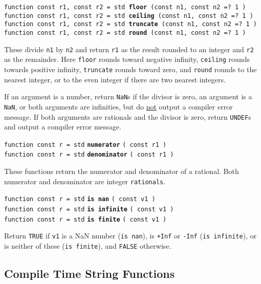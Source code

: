 \documentclass[12pt]{article}
\newcommand{\ttkey}[1]{{\tt \bfseries #1}}
\newenvironment{indpar}[1][0.3in]%
	{\begin{list}{}%
		     {\setlength{\itemsep}{0in}%
		      \setlength{\topsep}{0in}%
		      \setlength{\parsep}{1ex}%
		      \setlength{\labelwidth}{#1}%
		      \setlength{\leftmargin}{#1}%
		      \addtolength{\leftmargin}{\labelsep}}%
	 \item}%
	{\end{list}}
\begin{document}
{\tt function const r1, const r2 =
    std \ttkey{floor} (const n1, const n2 =? 1 )} \\
{\tt function const r1, const r2 =
    std \ttkey{ceiling} (const n1, const n2 =? 1 )} \\
{\tt function const r1, const r2 =
    std \ttkey{truncate} (const n1, const n2 =? 1 )} \\
{\tt function const r1, const r2 =
    std \ttkey{round} (const n1, const n2 =? 1 )}
\begin{indpar}
These divide {\tt n1} by {\tt n2} and return {\tt r1} as the
result rounded to an integer and {\tt r2} as the remainder.
Here {\tt floor} rounds toward negative infinity, {\tt ceiling}
rounds towards positive infinity, {\tt truncate} rounds toward
zero, and {\tt round} rounds to the nearest integer, or to the
even integer if there are two nearest integers.

If an argument is a number, return {\tt NaN}s if the divisor is
zero, an argument is a {\tt NaN}, or both arguments are infinities, but
do \underline{not} output a compiler error message.  If both
arguments are rationals and the divisor is zero, return
{\tt UNDEF}s and output a compiler error message.
\end{indpar}

{\tt function const r = std} \ttkey{numerator} {\tt ( const r1 )} \\
{\tt function const r = std} \ttkey{denominator} {\tt ( const r1 )}
\begin{indpar}
These functions return the numerator and denominator of a rational.
Both numerator and denominator are integer {\tt rationals}.
\end{indpar}

{\tt function const r = std} \ttkey{is nan} {\tt ( const v1 )} \\
{\tt function const r = std} \ttkey{is infinite} {\tt ( const v1 )} \\
{\tt function const r = std} \ttkey{is finite} {\tt ( const v1 )}
\begin{indpar}
Return {\tt TRUE} if {\tt v1} is a NaN number ({\tt is nan}),
is {\tt +Inf} or {\tt -Inf} ({\tt is infinite}), or
is neither of these ({\tt is finite}), and {\tt FALSE}
otherwise.
\end{indpar}

\subsection{Compile Time String Functions}
\end{document}

